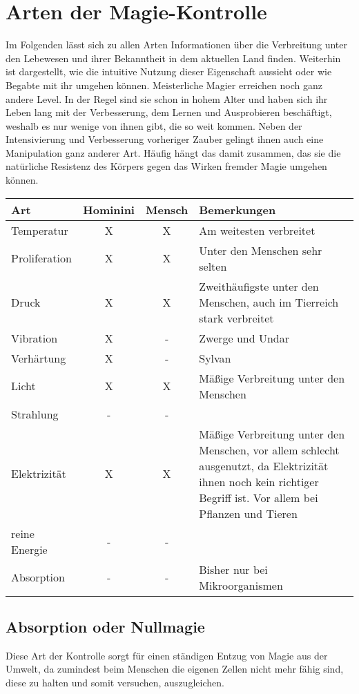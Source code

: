 \section{Arten der Magie-Kontrolle}
Im Folgenden lässt sich zu allen Arten Informationen über die Verbreitung unter den Lebewesen und ihrer Bekanntheit in dem aktuellen Land finden. Weiterhin ist dargestellt, wie die intuitive Nutzung dieser Eigenschaft aussieht oder wie Begabte mit ihr umgehen können. Meisterliche Magier erreichen noch ganz andere Level. In der Regel sind sie schon in hohem Alter und haben sich ihr Leben lang mit der Verbesserung, dem Lernen und Ausprobieren beschäftigt, weshalb es nur wenige von ihnen gibt, die so weit kommen. Neben der Intensivierung und Verbesserung vorheriger Zauber gelingt ihnen auch eine Manipulation ganz anderer Art. Häufig hängt das damit zusammen, das sie die natürliche Resistenz des Körpers gegen das Wirken fremder Magie umgehen können. \\

\begin{tabular}{l||c|c|p{8cm}}
	\textbf{Art} & \textbf{Hominini} & \textbf{Mensch} & \textbf{Bemerkungen} \\
	\hline \hline
	Temperatur & X & X & Am weitesten verbreitet \\
	\hline
	Proliferation & X & X & Unter den Menschen sehr selten \\
	\hline
	Druck & X & X & Zweithäufigste unter den Menschen, auch im Tierreich stark verbreitet \\
	\hline
	Vibration & X & - & Zwerge und Undar \\
	\hline
	Verhärtung & X & - & Sylvan \\
	\hline
	Licht & X & X & Mäßige Verbreitung unter den Menschen \\
	\hline
	Strahlung & - & - &  \\
	\hline
	Elektrizität & X & X & Mäßige Verbreitung unter den Menschen, vor allem schlecht ausgenutzt, da Elektrizität ihnen noch kein richtiger Begriff ist. Vor allem bei Pflanzen und Tieren \\
	\hline
	reine Energie & - & - &   \\
	\hline
	Absorption & - & - & Bisher nur bei Mikroorganismen \\
\end{tabular}



\subsection{Absorption oder Nullmagie}\label{sec:nullmagie}
Diese Art der Kontrolle sorgt für einen ständigen Entzug von Magie aus der Umwelt, da zumindest beim Menschen die eigenen Zellen nicht mehr fähig sind, diese zu halten und somit versuchen, auszugleichen. 

